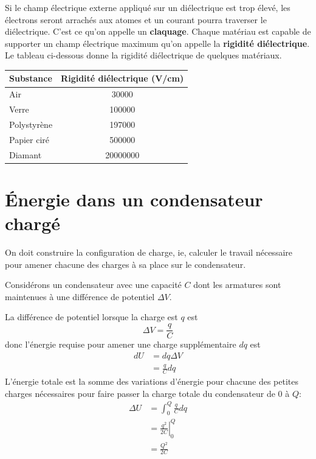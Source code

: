 
Si le champ électrique externe appliqué sur un diélectrique est trop élevé, les
électrons seront arrachés aux atomes et un courant pourra traverser le
diélectrique. C'est ce qu'on appelle un \textbf{claquage}. Chaque matériau est
capable de supporter un champ électrique maximum qu'on appelle la
\textbf{rigidité diélectrique}. Le tableau ci-dessous donne la rigidité
diélectrique de quelques matériaux.

\begin{diapobox}
  \begin{center}
  \begin{tabular}{lS}
    \toprule
    Substance       &        {Rigidité diélectrique (\si{V/cm})}     \\
    \midrule
    Air             &  30000  \\
    Verre           &  100000 \\
    Polystyrène     &  197000 \\
    Papier ciré     &  500000 \\
    Diamant         &  20000000 \\
    \bottomrule
  \end{tabular}
  \end{center}
\end{diapobox}


\section{Énergie dans un condensateur chargé}


On doit construire la configuration de charge, ie, calculer le travail
nécessaire pour amener chacune des charges à sa place sur le condensateur.

Considérons un condensateur avec une capacité $C$ dont les armatures sont
maintenues à une différence de potentiel $\Delta V$.

La différence de potentiel lorsque la charge est $q$ est
$$\Delta V = \frac{q}{C}$$
donc l'énergie requise pour amener une charge supplémentaire $dq$ est
\begin{align*}
  dU &= dq \Delta V \\
           &= \frac{q}{C} dq
\end{align*}
L'énergie totale est la somme des variations d'énergie pour chacune des petites
charges nécessaires pour faire passer la charge totale du condensateur de $0$ à
$Q$:
\begin{align*}
  \Delta U &= \int_0^Q \frac{q}{C} dq \\
           &= \left. \frac{q^2}{2C} \right|_0^Q \\
           &= \frac{Q^2}{2C}
\end{align*}



